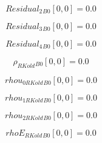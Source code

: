 \documentclass{article}
\begin{document}
\begin{dmath}{Residual_{2}{_{B0}}}[{0,0}] = 0.0\end{dmath}

\begin{dmath}{Residual_{3}{_{B0}}}[{0,0}] = 0.0\end{dmath}

\begin{dmath}{Residual_{4}{_{B0}}}[{0,0}] = 0.0\end{dmath}

\begin{dmath}{\rho_{RKold}{_{B0}}}[{0,0}] = 0.0\end{dmath}

\begin{dmath}{rhou_{0 RKold}{_{B0}}}[{0,0}] = 0.0\end{dmath}

\begin{dmath}{rhou_{1 RKold}{_{B0}}}[{0,0}] = 0.0\end{dmath}

\begin{dmath}{rhou_{2 RKold}{_{B0}}}[{0,0}] = 0.0\end{dmath}

\begin{dmath}{rhoE_{RKold}{_{B0}}}[{0,0}] = 0.0\end{dmath}
\end{document}
